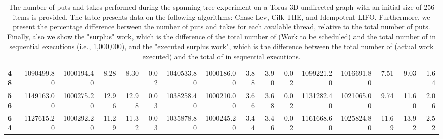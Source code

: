 \begin{table}[!ht]
{\begin{tabular}{lrrrrrrrrrrrrrrr}
\textbf{48} & 1090499.80 & 1000194.40 &           8.28 &        8.30 &                 0.02 & 1040533.80 & 1000186.00 &           3.88 &        3.90 &                 0.02 &      1099221.20 & 1016691.80 &           7.51 &        9.03 &                 1.64 \\
\textbf{56} & 1149163.00 & 1000275.20 &          12.96 &       12.98 &                 0.03 & 1038258.40 & 1000210.00 &           3.66 &        3.68 &                 0.02 &      1131282.40 & 1021065.00 &           9.74 &       11.60 &                 2.06 \\
\textbf{64} & 1127615.20 & 1000292.20 &          11.29 &       11.32 &                 0.03 & 1035878.80 & 1000245.20 &           3.44 &        3.46 &                 0.02 &      1161668.60 & 1025824.80 &          11.69 &       13.92 &                 2.52 \\
\bottomrule
\end{tabular}}
\label{difference-Torus_3D_undirected-256-CHASELEV-CILK-IDEMPOTENT_LIFO}
\caption{The number of puts and takes performed during the
    spanning tree experiment on a Torus 3D undirected graph with an initial size
    of 256 items is provided. The table presents data on the
    following algorithms: Chase-Lev, Cilk THE, and
    Idempotent LIFO. Furthermore, we present the percentage difference
    between the number of puts and takes for each available thread,
    relative to the total number of puts. Finally, also we show the
    "surplus" work, which is the difference of the total number of
    \Puts (Work to be scheduled) and the total number of \Puts in
    sequential executions (i.e., 1,000,000), and the "executed surplus
    work", which is the difference between the total number of \Takes
    (actual work executed) and the total of \Takes in sequential
    executions.}
\end{table}
